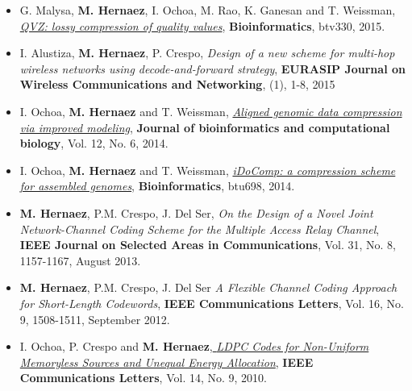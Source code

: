 \documentclass[11pt,a4paper,sans]{moderncv}        %
\begin{document}
\begin{itemize}
\item G. Malysa, \textbf{M. Hernaez}, I. Ochoa, M. Rao, K. Ganesan and T. Weissman, \href{http://web.stanford.edu/~iochoa/publishedPublications/2015_qvz_paper.pdf}{\emph{ QVZ: lossy compression of quality values}}, \textbf{Bioinformatics}, btv330, 2015.\\

\item I. Alustiza, \textbf{M. Hernaez}, P. Crespo, {\emph{Design of a new scheme for multi-hop wireless networks using decode-and-forward strategy}}, \textbf{EURASIP Journal on Wireless Communications and Networking}, (1), 1-8, 2015\\

\item I. Ochoa, \textbf{M. Hernaez} and T. Weissman, \href{http://web.stanford.edu/~iochoa/publishedPublications/2014_cbc.pdf}{\emph{ Aligned genomic data compression via improved modeling}}, \textbf{Journal of bioinformatics and computational biology}, Vol. 12, No. 6, 2014.\\

\item I. Ochoa, \textbf{M. Hernaez} and T. Weissman, \href{http://web.stanford.edu/~iochoa/publishedPublications/2014_idocomp_paper.pdf}{\emph{ iDoComp: a compression scheme for assembled genomes}}, \textbf{Bioinformatics}, btu698, 2014.\\

\item \textbf{M. Hernaez}, P.M. Crespo, J. {Del Ser}, {\emph{ On the Design of a Novel Joint Network-Channel Coding Scheme for the Multiple Access Relay Channel}}, \textbf{IEEE Journal on Selected Areas in Communications}, Vol. 31, No. 8, 1157-1167, August 2013.\\

\item \textbf{M. Hernaez}, P.M. Crespo, J. {Del Ser} \emph{A Flexible Channel Coding Approach for Short-Length Codewords}, \textbf{IEEE Communications Letters}, Vol. 16, No. 9, 1508-1511, September 2012.\\

\item I. Ochoa, P. Crespo and \textbf{M. Hernaez},\href{http://web.stanford.edu/~iochoa/publishedPublications/2010_ldpc_paper.pdf} {\emph{ LDPC Codes for Non-Uniform Memoryless Sources and Unequal Energy Allocation}}, \textbf{IEEE Communications Letters}, Vol. 14, No. 9, 2010.\\


\end{itemize}
\end{document}

